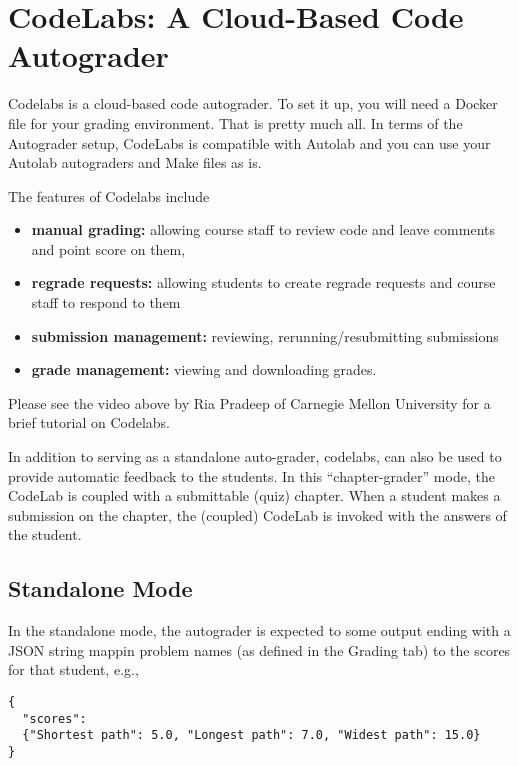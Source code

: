 \chapter{CodeLabs: A Cloud-Based Code Autograder}
\label{ch:codelabs}

Codelabs is a cloud-based code autograder.  To set it up, you will
need a Docker file for your grading environment.  That is pretty much
all.  In terms of the Autograder setup, CodeLabs is compatible with
Autolab and you can use your Autolab autograders and Make files as is.

The features of Codelabs include
\begin{itemize}
\item  
\textbf{manual grading:} allowing course staff to review code and leave comments and point
score on them,

\item
\textbf{regrade requests:} allowing students to create regrade
requests and course staff to respond to them

\item
  \textbf{submission management:} reviewing, rerunning/resubmitting submissions

\item
  \textbf{grade management:} viewing and downloading grades.
\end{itemize}
%
Please see the video above by Ria Pradeep of Carnegie Mellon University for a brief tutorial on Codelabs.

In addition to serving as a standalone auto-grader, codelabs, can also
be used to provide automatic feedback to the students.
%
In this ``chapter-grader'' mode, the CodeLab is coupled with a submittable
(quiz) chapter.
%
When a student makes a submission on the chapter, the (coupled) CodeLab is invoked with the answers of the student.

\section{Standalone Mode}
\label{sec:codelabs::standalone}

\begin{gram}
\label{sec:codelabs::standalone::output}

In the standalone mode, the autograder is expected to some output ending with a JSON string mappin problem names (as defined in the Grading tab) to the scores for that student, e.g.,
  
\begin{lstlisting}
{
  "scores":
  {"Shortest path": 5.0, "Longest path": 7.0, "Widest path": 15.0}
}
\end{lstlisting}
  
\end{gram}



